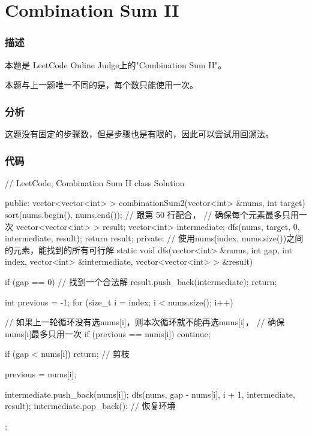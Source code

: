 \section{Combination Sum II} %

\subsubsection{描述}
本题是 LeetCode Online Judge上的"Combination Sum II"。

本题与上一题唯一不同的是，每个数只能使用一次。

\subsubsection{分析}
这题没有固定的步骤数，但是步骤也是有限的，因此可以尝试用回溯法。

\subsubsection{代码}
\begin{Codex}[label=combination_sum2.cpp]
// LeetCode, Combination Sum II
class Solution {
public:
    vector<vector<int> > combinationSum2(vector<int> &nums, int target) {
        sort(nums.begin(), nums.end()); // 跟第 50 行配合，
                                             // 确保每个元素最多只用一次
        vector<vector<int> > result;
        vector<int> intermediate;
        dfs(nums, target, 0, intermediate, result);
        return result;
    }
private:
    // 使用nums[index, nums.size())之间的元素，能找到的所有可行解
    static void dfs(vector<int> &nums, int gap, int index,
            vector<int> &intermediate, vector<vector<int> > &result) {
        if (gap == 0) {  //  找到一个合法解
            result.push_back(intermediate);
            return;
        }

        int previous = -1;
        for (size_t i = index; i < nums.size(); i++) {
            // 如果上一轮循环没有选nums[i]，则本次循环就不能再选nums[i]，
            // 确保nums[i]最多只用一次
            if (previous == nums[i]) continue;

            if (gap < nums[i]) return;  // 剪枝

            previous = nums[i];

            intermediate.push_back(nums[i]);
            dfs(nums, gap - nums[i], i + 1, intermediate, result);
            intermediate.pop_back();  // 恢复环境
        }
    }
};
\end{Codex}


